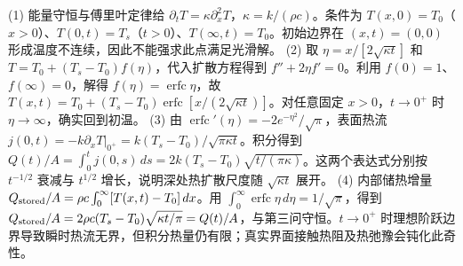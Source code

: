 (1) 能量守恒与傅里叶定律给 \(\partial_tT=\kappa\partial_x^2T\)，\(\kappa=k/(\rho c)\)。条件为 \(T(x,0)=T_0\)（\(x>0\)）、\(T(0,t)=T_s\)（\(t>0\)）、\(T(\infty,t)=T_0\)。初始边界在 \((x,t)=(0,0)\) 形成温度不连续，因此不能强求此点满足光滑解。
(2) 取 \(\eta=x/[2\sqrt{\kappa t}]\) 和 \(T=T_0+(T_s-T_0)f(\eta)\)，代入扩散方程得到 \(f''+2\eta f'=0\)。利用 \(f(0)=1\)、\(f(\infty)=0\)，解得 \(f(\eta)=\operatorname{erfc}\eta\)，故 \(T(x,t)=T_0+(T_s-T_0)\operatorname{erfc}[x/(2\sqrt{\kappa t})]\)。对任意固定 \(x>0\)，\(t\to0^+\) 时 \(\eta\to\infty\)，确实回到初温。
(3) 由 \(\operatorname{erfc}'(\eta)=-2e^{-\eta^2}/\sqrt\pi\)，表面热流 \(j(0,t)=-k\partial_xT|_{0^+}=k(T_s-T_0)/\sqrt{\pi\kappa t}\)。积分得到 \(Q(t)/A=\int_0^tj(0,s)\,ds=2k(T_s-T_0)\sqrt{t/(\pi\kappa)}\)。这两个表达式分别按 \(t^{-1/2}\) 衰减与 \(t^{1/2}\) 增长，说明深处热扩散尺度随 \(\sqrt{\kappa t}\) 展开。
(4) 内部储热增量 \(Q_{\rm stored}/A=\rho c\int_0^\infty[T(x,t)-T_0]\,dx\)。用 \(\int_0^\infty\operatorname{erfc}\eta\,d\eta=1/\sqrt\pi\)，得到 \(Q_{\rm stored}/A=2\rho c(T_s-T_0)\sqrt{\kappa t/\pi}=Q(t)/A\)，与第三问守恒。\(t\to0^+\) 时理想阶跃边界导致瞬时热流无界，但积分热量仍有限；真实界面接触热阻及热弛豫会钝化此奇性。
